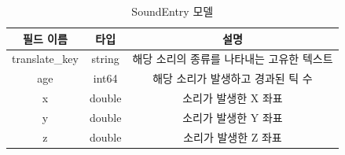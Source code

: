 \documentclass[oneside, under, ko]{snuthesis}
\begin{document}
\begin{table}
    \renewcommand{\arraystretch}{1.5} %
    \centering
    \begin{tabular}{|c|c|c|}
      \hline
      \textbf{필드 이름} & \textbf{타입} & \textbf{설명} \\
      \hline
      translate\_key & string & 해당 소리의 종류를 나타내는 고유한 텍스트 \\\hline
      age & int64 & 해당 소리가 발생하고 경과된 틱 수 \\\hline
      x & double & 소리가 발생한 X 좌표 \\\hline
      y & double & 소리가 발생한 Y 좌표 \\\hline
      z & double & 소리가 발생한 Z 좌표 \\
      \hline
    \end{tabular}
    \caption{SoundEntry 모델}
    \label{tab:sound_entry}
\end{table}
\end{document}
